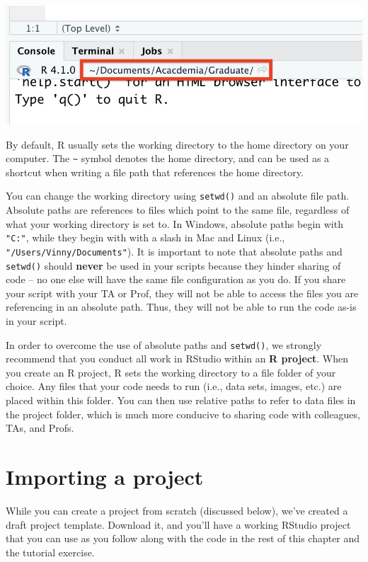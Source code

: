 \documentclass[
]{book}
\begin{document}
\includegraphics{images/Rstudio_wd.png}

By default, R usually sets the working directory to the home directory on your computer. The \texttt{\textasciitilde{}} symbol denotes the home directory, and can be used as a shortcut when writing a file path that references the home directory.

You can change the working directory using \texttt{setwd()} and an absolute file path. Absolute paths are references to files which point to the same file, regardless of what your working directory is set to. In Windows, absolute paths begin with \texttt{"C:"}, while they begin with with a slash in Mac and Linux (i.e., \texttt{"/Users/Vinny/Documents"}). It is important to note that absolute paths and \texttt{setwd()} should \textbf{never} be used in your scripts because they hinder sharing of code -- no one else will have the same file configuration as you do. If you share your script with your TA or Prof, they will not be able to access the files you are referencing in an absolute path. Thus, they will not be able to run the code as-is in your script.

In order to overcome the use of absolute paths and \texttt{setwd()}, we strongly recommend that you conduct all work in RStudio within an \textbf{R project}. When you create an R project, R sets the working directory to a file folder of your choice. Any files that your code needs to run (i.e., data sets, images, etc.) are placed within this folder. You can then use relative paths to refer to data files in the project folder, which is much more conducive to sharing code with colleagues, TAs, and Profs.

\hypertarget{importing-a-project}{%
\section{Importing a project}\label{importing-a-project}}

While you can create a project from scratch (discussed below), we've created a draft project template. Download it, and you'll have a working RStudio project that you can use as you follow along with the code in the rest of this chapter and the tutorial exercise.
\end{document}
